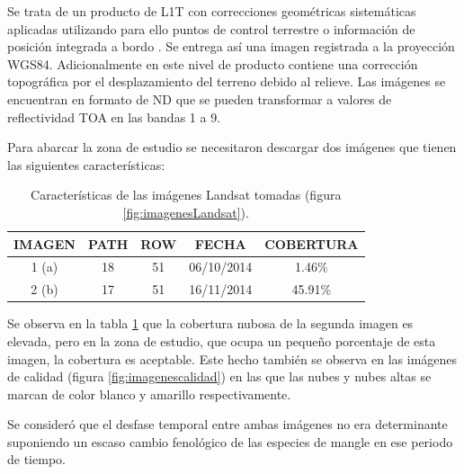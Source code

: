 Se trata de un producto de \ac{L1T} con correcciones geométricas sistemáticas aplicadas utilizando para ello puntos de control terrestre o información de posición integrada a bordo \citep{Ariza2013}. Se entrega así una imagen registrada a la proyección WGS84. Adicionalmente en este nivel de producto contiene una corrección topográfica por el desplazamiento del terreno debido al relieve. Las imágenes se encuentran en formato de \ac{ND} que se pueden transformar a valores de reflectividad \ac{TOA} en las bandas 1 a 9.

Para abarcar la zona de estudio se necesitaron descargar dos imágenes que tienen las siguientes características:

\begin{table}[h]
	\centering
	\caption[Caracerísticas de las imágenes Landsat]{Características de las imágenes Landsat tomadas (figura \ref{fig:imagenesLandsat}).}
	\begin{tabular}{|c|c|c|c|c|}
	\hline
	IMAGEN & PATH & ROW & FECHA & COBERTURA \\
	\hline
	1 (a) & 18 & 51 & 06/10/2014 & 1.46\% \\
	\hline
	2 (b) & 17 & 51 & 16/11/2014 & 45.91\% \\
	\hline
	\end{tabular}
	\label{tab:imagenes}
\end{table}

Se observa en la tabla \ref{tab:imagenes} que la cobertura nubosa de la segunda imagen es elevada, pero en la zona de estudio, que ocupa un pequeño porcentaje de esta imagen, la cobertura es aceptable. Este hecho también se observa en las imágenes de calidad (figura \ref{fig:imagenescalidad}) en las que las nubes y nubes altas se marcan de color blanco y amarillo respectivamente.\Sep

Se consideró que el desfase temporal entre ambas imágenes no era determinante suponiendo un escaso cambio fenológico de las especies de mangle en ese periodo de tiempo.

